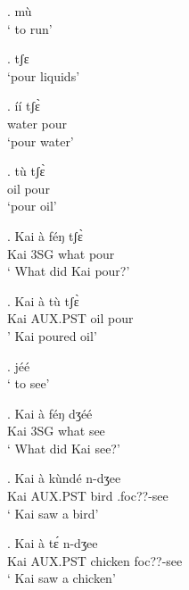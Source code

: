 \documentclass{assets/fieldnotes}
\begin{document}
\ex. mù\\
` to run'

\ex. tʃɛ\\
`pour liquids'

\exg. íí tʃɛ̀\\
water pour\\
`pour water'

\exg. tù tʃɛ̀\\
oil pour\\
`pour oil'

\exg. Kai à féŋ tʃɛ̀\\
Kai 3SG what pour\\
` What did Kai pour?'


\exg. Kai à tù tʃɛ̀\\
Kai AUX.PST oil pour\\
' Kai poured oil'


\ex. jéé\\
` to see'

\exg. Kai à féŋ dʒéé\\
Kai 3SG what see\\
` What did Kai see?'

\exg. Kai à kùndé n-dʒee\\
Kai AUX.PST bird .foc??-see\\
` Kai saw a bird'

\exg. Kai à tɛ́ n-dʒee\\
Kai AUX.PST chicken foc??-see\\
` Kai saw a chicken'
\end{document}
